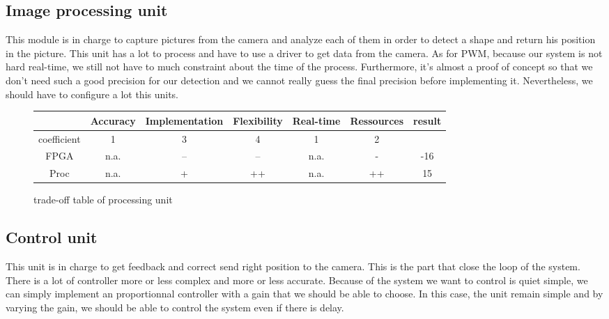 \subsection{Image processing unit}

This module is in charge to capture pictures from the camera and analyze each of them in order to detect a shape and return his position in the picture. This unit has a lot to process and have to use a driver to get data from the camera. As for PWM, because our system is not hard real-time, we still not have to much constraint about the time of the process. Furthermore, it's almost a proof of concept so that we don't need  such a good precision for our detection and we cannot really guess the final precision before implementing it. Nevertheless, we should have to configure a lot this units.

\begin{figure}[!ht]
\hspace{-1cm}
\begin{tabular}{|c|c|c|c|c|c|c|}\hline
                         & Accuracy  & Implementation & Flexibility & Real-time & Ressources & result \\\hline
coefficient   &         1          &           3                      &         4           &           1         &         2               &             \\\hline
FPGA            &      n.a.        &            --                   &         --          &        n.a.       &         -              &      -16  \\\hline
Proc               &      n.a.         &            +                   &         ++        &         n.a.      &          ++          &       15    \\\hline
\end{tabular}
\caption{trade-off table of processing unit}
\end{figure}

\subsection{Control unit}

This unit is in charge to get feedback and correct send right position to the camera. This is the part that close the loop of the system. There is a lot of controller more or less complex and more or less accurate. Because of the system we want to control is quiet simple, we can simply implement an proportionnal controller with a gain that we should be able to choose. In this case, the unit remain simple and by varying the gain, we should be able to control the system even if there is delay.

